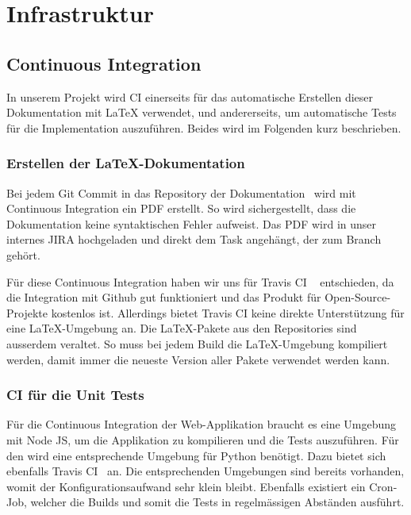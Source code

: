 
\section{Infrastruktur}
\label{Infrastruktur}

\subsection{Continuous Integration}
\label{Infrastruktur:Continuous Integration}

In unserem Projekt wird \ac{CI} einerseits für das automatische Erstellen dieser Dokumentation mit LaTeX verwendet, und andererseits, um automatische Tests für die Implementation auszuführen.
Beides wird im Folgenden kurz beschrieben.

\subsubsection{Erstellen der LaTeX-Dokumentation}
\label{CI:Erstellen der LaTeX-Dokumentation}

Bei jedem Git Commit in das Repository der Dokumentation~\cite{github:thesis} wird mit Continuous Integration ein PDF erstellt.
So wird sichergestellt, dass die Dokumentation keine syntaktischen Fehler aufweist.
Das PDF wird in unser internes JIRA hochgeladen und direkt dem Task angehängt, der zum Branch gehört.

Für diese Continuous Integration haben wir uns für Travis CI ~\cite{travis-ci} entschieden, da die Integration mit Github gut funktioniert und das Produkt für Open-Source-Projekte kostenlos ist.
Allerdings bietet Travis CI keine direkte Unterstützung für eine LaTeX-Umgebung an. Die LaTeX-Pakete aus den Repositories sind ausserdem veraltet.
So muss bei jedem Build die LaTeX-Umgebung kompiliert werden, damit immer die neueste Version aller Pakete verwendet werden kann.


\subsubsection{CI für die Unit Tests}
\label{CI:CI für Backend}

Für die Continuous Integration der Web-Applikation braucht es eine Umgebung mit Node JS, um die Applikation zu kompilieren und die Tests auszuführen.
Für den  wird eine entsprechende Umgebung für Python benötigt.
Dazu bietet sich ebenfalls Travis CI~\cite{travis-ci} an.
Die entsprechenden Umgebungen sind bereits vorhanden, womit der Konfigurationsaufwand sehr klein bleibt.
Ebenfalls existiert ein Cron-Job, welcher die Builds und somit die Tests in regelmässigen Abständen ausführt.

